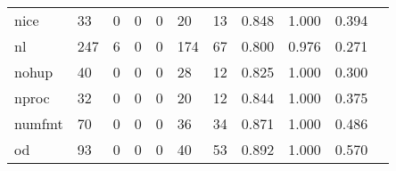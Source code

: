 \begin{longtable}{lp{1.20cm}p{1.20cm}p{1.20cm}p{1.20cm}p{1.20cm}p{1.20cm}p{1.20cm}p{1.20cm}p{1.20cm}p{1.20cm}}
nice      &                                    33 &                                                  0 &                                                  0 &                                                  0 &                                                 20 &                                                 13 &                                         0.848 &                                              1.000 &                                              0.394 \\
nl        &                                   247 &                                                  6 &                                                  0 &                                                  0 &                                                174 &                                                 67 &                                         0.800 &                                              0.976 &                                              0.271 \\
nohup     &                                    40 &                                                  0 &                                                  0 &                                                  0 &                                                 28 &                                                 12 &                                         0.825 &                                              1.000 &                                              0.300 \\
nproc     &                                    32 &                                                  0 &                                                  0 &                                                  0 &                                                 20 &                                                 12 &                                         0.844 &                                              1.000 &                                              0.375 \\
numfmt    &                                    70 &                                                  0 &                                                  0 &                                                  0 &                                                 36 &                                                 34 &                                         0.871 &                                              1.000 &                                              0.486 \\
od        &                                    93 &                                                  0 &                                                  0 &                                                  0 &                                                 40 &                                                 53 &                                         0.892 &                                              1.000 &                                              0.570 \\

\end{longtable}
